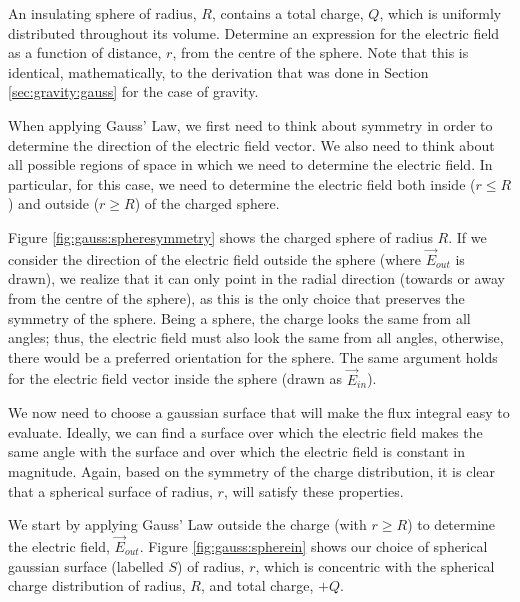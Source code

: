 \begin{example}{An insulating sphere of radius, $R$, contains a total charge, $Q$, which is uniformly distributed throughout its volume. Determine an expression for the electric field as a function of distance, $r$, from the centre of the sphere.}
Note that this is identical, mathematically, to the derivation that was done in Section \ref{sec:gravity:gauss} for the case of gravity. 

When applying Gauss' Law, we first need to think about symmetry in order to determine the direction of the electric field vector. We also need to think about all possible regions of space in which we need to determine the electric field. In particular, for this case, we need to determine the electric field both inside ($r\leq R$) and outside ($r\geq R$) of the charged sphere.

Figure \ref{fig:gauss:spheresymmetry} shows the charged sphere of radius $R$. If we consider the direction of the electric field outside the sphere (where $\vec E_{out}$ is drawn), we realize that it can only point in the radial direction (towards or away from the centre of the sphere), as this is the only choice that preserves the symmetry of the sphere. Being a sphere, the charge looks the same from all angles; thus, the electric field must also look the same from all angles, otherwise, there would be a preferred orientation for the sphere. The same argument holds for the electric field vector inside the sphere (drawn as $\vec E_{in}$). 

We now need to choose a gaussian surface that will make the flux integral easy to evaluate. Ideally, we can find a surface over which the electric field makes the same angle with the surface and over which the electric field is constant in magnitude. Again, based on the symmetry of the charge distribution, it is clear that a spherical surface of radius, $r$, will satisfy these properties.

We start by applying Gauss' Law outside the charge (with $r\geq R$) to determine the electric field, $\vec E_{out}$. Figure \ref{fig:gauss:spherein} shows our choice of spherical gaussian surface (labelled $S$) of radius, $r$, which is concentric with the spherical charge distribution of radius, $R$, and total charge, $+Q$.


\end{example}
